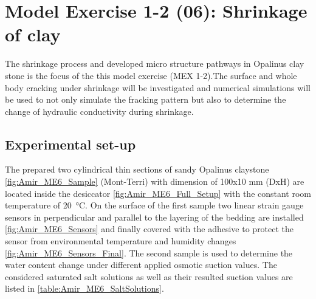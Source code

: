 \section{Model Exercise 1-2 (06): Shrinkage of clay}
\label{sec:mex06}
The shrinkage process and developed micro structure pathways in Opalinus clay stone is the focus of the this model exercise (MEX 1-2).The surface and whole body cracking under shrinkage will be investigated and numerical simulations will be used to not only simulate the fracking pattern but also to determine the change of hydraulic conductivity during shrinkage. 
\subsection{Experimental set-up}
The prepared two cylindrical thin sections of sandy Opalinus claystone \ref{fig:Amir_ME6_Sample} (Mont-Terri) with dimension of 100x10 mm (DxH) are located inside the desiccator \ref{fig:Amir_ME6_Full_Setup} with the constant room temperature of 20\ °C. On the surface of the first sample two linear strain gauge sensors in perpendicular and parallel to the layering of the bedding are installed \ref{fig:Amir_ME6_Sensors} and finally covered with the adhesive to protect the sensor from environmental temperature and humidity changes \ref{fig:Amir_ME6_Sensors_Final}. The second sample is used to determine the water content change under different applied osmotic suction values. The considered saturated salt solutions \cite{Minardietal2016} as well as their resulted suction values are listed in \ref{table:Amir_ME6_SaltSolutions}.

